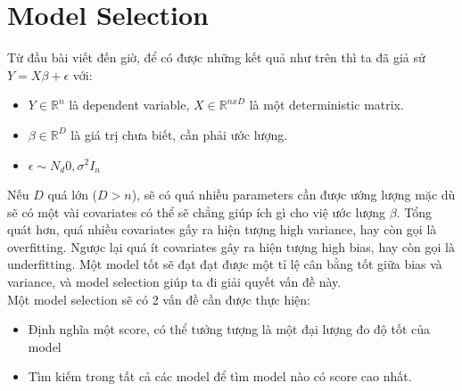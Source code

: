 \documentclass[10pt]{article}
\begin{document}
\begin{enumerate}
\end{enumerate}

\section{Model Selection}
Từ đầu bài viết đến giờ, để có được những kết quả như trên thì ta đã giả sử $Y=X\beta + \epsilon$ với:
\begin{itemize}

\item $Y \in \mathbb{R}^{n}$ là dependent variable, $X\in \mathbb{R}^{nxD}$ là một deterministic matrix.
\item $\beta \in \mathbb{R}^{D}$ là giá trị chưa biết, cần phải ước lượng.
\item $\epsilon \sim N_d{0,\sigma^2 I_n}$

\end{itemize}
Nếu $D$ quá lớn ($D > n$), sẽ có quá nhiều parameters cần được ướng lượng mặc dù sẽ có một vài covariates có thể sẽ chẳng giúp ích gì cho việ ước lượng $\beta$. Tổng quát hơn, quá nhiều covariates gấy ra hiện tượng high variance, hay còn gọi là overfitting. Ngược lại quá ít covariates gây ra hiện tượng high bias, hay còn gọi là underfitting. Một model tốt sẽ đạt đạt được một tỉ lệ cân bằng tốt giữa bias và variance, và model selection giúp ta đi giải quyết vấn đề này.\\

Một model selection sẽ có 2 vấn đề cần được thực hiện:
\begin{itemize}


\item Định nghĩa một score, có thể tưởng tượng là một đại lượng đo độ tốt của model
\item Tìm kiếm trong tất cả các model để tìm model nào có score cao nhất.

\end{itemize}
\end{document}

